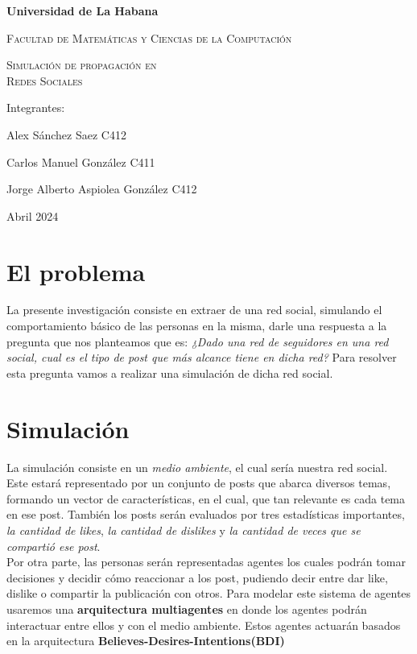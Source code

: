 \documentclass[12pt]{article}
\begin{document}
    \sloppypar
    \begin{titlepage}
        \centering
        {\bfseries\LARGE{Universidad de La Habana} \par}
        {\scshape\Large{Facultad de Matemáticas y Ciencias de la Computación} \par}
        \vspace{2cm}
        {\scshape\huge{Simulación de propagación en \\ Redes Sociales}\par}
        \vfill
        \vspace{1cm}
        {\LARGE{Integrantes:} \par}
        \vspace{0.5cm}
        {\Large{Alex Sánchez Saez C412} \par}
        {\Large{Carlos Manuel González C411} \par}
        {\Large{Jorge Alberto Aspiolea González C412} \par}
        \vfill
        {\Large{Abril 2024} \par}
    \end{titlepage}

\section{El problema}

La presente investigación consiste en extraer de una red social, simulando el comportamiento básico de las personas en la misma, darle una respuesta 
a la pregunta que nos planteamos que es: \textit{¿Dado una red de seguidores en una red social, cual es el tipo de post que más alcance tiene en dicha red?} 
Para resolver esta pregunta vamos a realizar una simulación de dicha red social.

\section{Simulación}

La simulación consiste en un \textit{medio ambiente}, el cual sería nuestra red social. Este estará representado por un conjunto de posts que abarca diversos temas, formando un vector
de características, en el cual, que tan relevante es cada tema en ese post. También los posts serán evaluados por tres estadísticas importantes, \textit{la cantidad de likes}, 
\textit{la cantidad de dislikes} y \textit{la cantidad de veces que se compartió ese post}.
\\
Por otra parte, las personas serán representadas agentes los cuales podrán tomar decisiones y decidir cómo reaccionar a los post, pudiendo decir entre dar like, dislike o compartir la publicación con otros.
Para modelar este sistema de agentes usaremos una \textbf{arquitectura multiagentes} en donde los agentes podrán interactuar entre ellos y con el medio ambiente. Estos agentes actuarán basados en la 
arquitectura \textbf{Believes-Desires-Intentions(BDI)}
\end{document}
